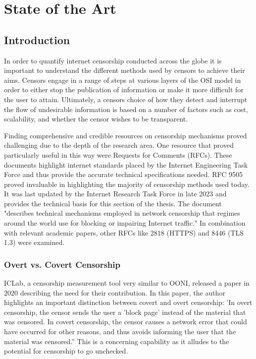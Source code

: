 \chapter{State of the Art}
\section{Introduction}

In order to quantify internet censorship conducted across the globe it is important to understand the different methods used by censors to achieve their aims. Censors engage in a range of steps at various layers of the OSI model in order to either stop the publication of information or make it more difficult for the user to attain. Ultimately, a censors choice of how they detect and interrupt the flow of undesirable information is based on a number of factors such as cost, scalability, and whether the censor wishes to be transparent.

Finding comprehensive and credible resources on censorship mechanisms proved challenging due to the depth of the research area. One resource that proved particularly useful in this way were Requests for Comments (RFCs). These documents highlight internet standards placed by the Internet Engineering Task Force and thus provide the accurate technical specifications needed. RFC 9505 proved invaluable in highlighting the majority of censorship methods used today. It was last updated by the Internet Research Task Force in late 2023 and provides the technical basis for this section of the thesis. The document "describes technical mechanisms employed in network censorship that regimes around the world use for blocking or impairing Internet traffic."\cite{rfc9505} In combination with relevant academic papers, other RFCs like 2818 (HTTPS) \cite{rfc2818} and 8446 (TLS 1.3) \cite{rfc8446} were examined.

\subsection{Overt vs. Covert Censorship }
ICLab, a censorship measurement tool very similar to OONI, released a paper in 2020 describing the need for their contribution. In this paper, the author highlights an important distinction between covert and overt censorship: 'In overt censorship, the censor sends the user a 'block page' instead of the material that was censored. In covert censorship, the censor causes a network error that could have occurred for other reasons, and thus avoids informing the user that the material was censored.” \cite{9152784} This is a concerning capability as it alludes to the potential for censorship to go unchecked. 


